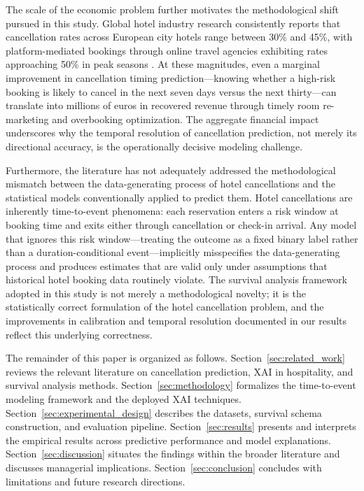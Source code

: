 \documentclass[pdflatex,sn-mathphys-ay]{sn-jnl}
\theoremstyle{thmstyleone}%
\theoremstyle{thmstyletwo}%
\theoremstyle{thmstylethree}%
\begin{document}
The scale of the economic problem further motivates the methodological shift pursued in this study. Global hotel industry research consistently reports that cancellation rates across European city hotels range between 30\% and 45\%, with platform-mediated bookings through online travel agencies exhibiting rates approaching 50\% in peak seasons \citep{antonio2019big, falk2018modelling}. At these magnitudes, even a marginal improvement in cancellation timing prediction—knowing whether a high-risk booking is likely to cancel in the next seven days versus the next thirty—can translate into millions of euros in recovered revenue through timely room re-marketing and overbooking optimization. The aggregate financial impact underscores why the temporal resolution of cancellation prediction, not merely its directional accuracy, is the operationally decisive modeling challenge.

Furthermore, the literature has not adequately addressed the methodological mismatch between the data-generating process of hotel cancellations and the statistical models conventionally applied to predict them. Hotel cancellations are inherently time-to-event phenomena: each reservation enters a risk window at booking time and exits either through cancellation or check-in arrival. Any model that ignores this risk window—treating the outcome as a fixed binary label rather than a duration-conditional event—implicitly misspecifies the data-generating process and produces estimates that are valid only under assumptions that historical hotel booking data routinely violate. The survival analysis framework adopted in this study is not merely a methodological novelty; it is the statistically correct formulation of the hotel cancellation problem, and the improvements in calibration and temporal resolution documented in our results reflect this underlying correctness.

The remainder of this paper is organized as follows. Section~\ref{sec:related_work} reviews the relevant literature on cancellation prediction, XAI in hospitality, and survival analysis methods. Section~\ref{sec:methodology} formalizes the time-to-event modeling framework and the deployed XAI techniques. Section~\ref{sec:experimental_design} describes the datasets, survival schema construction, and evaluation pipeline. Section~\ref{sec:results} presents and interprets the empirical results across predictive performance and model explanations. Section~\ref{sec:discussion} situates the findings within the broader literature and discusses managerial implications. Section~\ref{sec:conclusion} concludes with limitations and future research directions.
\end{document}

